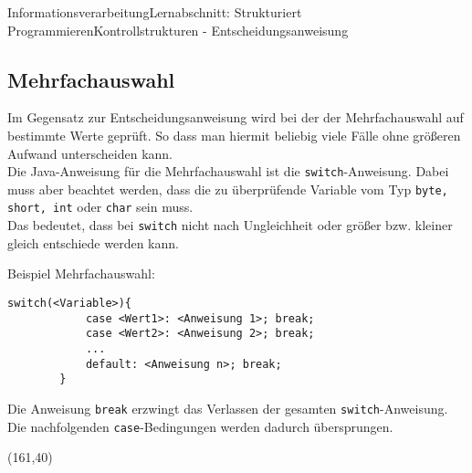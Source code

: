 \documentclass[11pt,oneside,openany,headings=optiontotoc,11pt,numbers=noenddot]{article}
\begin{document}
\begin{worksheet}{Informationsverarbeitung}{Lernabschnitt: Strukturiert Programmieren}{Kontrollstrukturen - Entscheidungsanweisung}
		\subsection{Mehrfachauswahl}
		Im Gegensatz zur Entscheidungsanweisung wird bei der der Mehrfachauswahl auf bestimmte Werte geprüft. So dass man hiermit beliebig viele Fälle ohne größeren Aufwand unterscheiden kann.\\
		Die Java-Anweisung für die Mehrfachauswahl ist die \lstinline[style=JavaInputStyle]|switch|-Anweisung. Dabei muss aber beachtet werden, dass die zu überprüfende Variable vom Typ \lstinline[style=JavaInputStyle]|byte, short, int| oder \lstinline[style=JavaInputStyle]|char| sein muss.\\
		Das bedeutet, dass bei \lstinline[style=JavaInputStyle]|switch| nicht nach Ungleichheit oder größer bzw. kleiner gleich entschiede werden kann.
		\par\noindent
		Beispiel Mehrfachauswahl:
		\begin{lstlisting}[style=JavaInputStyle,frame=single]
		switch(<Variable>){
			case <Wert1>: <Anweisung 1>; break;
			case <Wert2>: <Anweisung 2>; break;
			...
			default: <Anweisung n>; break;
		}
		\end{lstlisting}
		Die Anweisung \lstinline[style=JavaInputStyle]|break| erzwingt das Verlassen der gesamten \lstinline[style=JavaInputStyle]|switch|-Anweisung. Die nachfolgenden \lstinline[style=JavaInputStyle]|case|-Bedingungen werden dadurch übersprungen.\\
		\begin{struktogramm}(161,40)
			\caseend
		\end{struktogramm}
	\end{worksheet}
\end{document}
